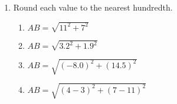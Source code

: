 \documentclass[12pt, twoside]{article}
\begin{document}
\begin{enumerate}
  \item Round each value to the nearest hundredth. \vspace{.5cm}
  \begin{multicols}{2}
    \begin{enumerate}
      \item $AB=\sqrt{11^2+7^2}$ \vspace{3.5cm}
      \item $AB=\sqrt{3.2^2+1.9^2}$
      \item $AB=\sqrt{(-8.0)^2+(14.5)^2}$ \vspace{3.5cm}
      \item $AB=\sqrt{(4-3)^2+(7-11)^2}$
    \end{enumerate}
  \end{multicols} \vspace{1cm}

\end{enumerate}
\end{document}
